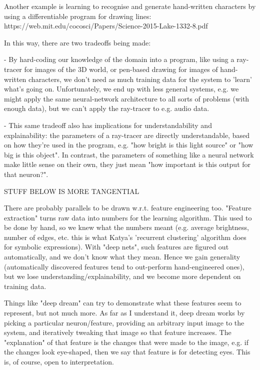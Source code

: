 \documentclass{article}
\begin{document}
Another example is learning to recognise and generate hand-written
characters by using a differentiable program for drawing lines:
https://web.mit.edu/cocosci/Papers/Science-2015-Lake-1332-8.pdf

In this way, there are two tradeoffs being made:

 - By hard-coding our knowledge of the domain into a program, like using
   a ray-tracer for images of the 3D world, or pen-based drawing for
   images of hand-written characters, we don't need as much training
   data for the system to 'learn' what's going on. Unfortunately, we end
   up with less general systems, e.g. we might apply the same
   neural-network architecture to all sorts of problems (with enough
   data), but we can't apply the ray-tracer to e.g. audio data.

 - This same tradeoff also has implications for understandability and
   explainability: the parameters of a ray-tracer are directly
   understandable, based on how they're used in the program, e.g. "how
   bright is this light source" or "how big is this object". In
   contrast, the parameters of something like a neural network make
   little sense on their own, they just mean "how important is this
   output for that neuron?".

STUFF BELOW IS MORE TANGENTIAL

There are probably parallels to be drawn w.r.t. feature engineering
too. "Feature extraction" turns raw data into numbers for the learning
algorithm. This used to be done by hand, so we knew what the numbers
meant (e.g. average brightness, number of edges, etc. this is what
Katya's 'recurrent clustering' algorithm does for symbolic expressions).
With "deep nets", such features are figured out automatically, and we
don't know what they mean. Hence we gain generality (automatically
discovered features tend to out-perform hand-engineered ones), but we
lose understanding/explainability, and we become more dependent on
training data.

Things like "deep dream" can try to demonstrate what these features
seem to represent, but not much more. As far as I understand it, deep
dream works by picking a particular neuron/feature, providing an
arbitrary input image to the system, and iteratively tweaking that image
so that feature increases. The "explanation" of that feature is the
changes that were made to the image, e.g. if the changes look
eye-shaped, then we say that feature is for detecting eyes. This is, of
course, open to interpretation.
\end{document}
